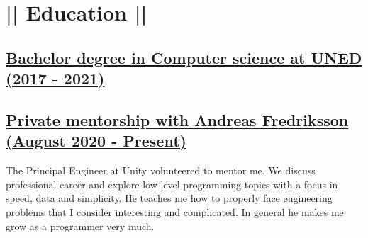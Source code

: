 \section*{|| Education ||}
\subsection*{\underline{Bachelor degree in Computer science at UNED (2017 - 2021)}}
\subsection*{\underline{Private mentorship with Andreas Fredriksson (August 2020 - Present)}}
The Principal Engineer at Unity volunteered to mentor me. We discuss professional career and explore low-level programming topics with a focus in speed, data and simplicity. He teaches me how to properly face engineering problems that I consider interesting and complicated. In general he makes me grow as a programmer very much.